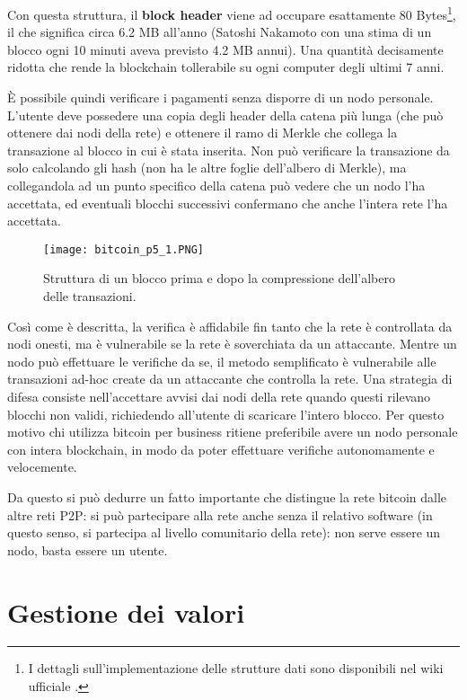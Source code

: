 Con questa struttura, il \textbf{block header} viene ad occupare esattamente 80 Bytes\footnote{I dettagli sull'implementazione delle strutture dati sono disponibili nel wiki ufficiale \cite{bitcoin-protocol}.}, il che significa circa 6.2 MB all'anno (Satoshi Nakamoto con una stima di un blocco ogni 10 minuti aveva previsto 4.2 MB annui). Una quantità decisamente ridotta che rende la blockchain tollerabile su ogni computer degli ultimi 7 anni.

È possibile quindi verificare i pagamenti senza disporre di un nodo personale. L'utente deve possedere una copia degli header della catena più lunga (che può ottenere dai nodi della rete) e ottenere il ramo di Merkle che collega la transazione al blocco in cui è stata inserita. Non può verificare la transazione da solo calcolando gli hash (non ha le altre foglie dell'albero di Merkle), ma collegandola ad un punto specifico della catena può vedere che un nodo l'ha accettata, ed eventuali blocchi successivi confermano che anche l'intera rete l'ha accettata.

\begin{figure}[htbp]
\centering
\texttt{[image: bitcoin\_p5\_1.PNG]}
\caption{Struttura di un blocco prima e dopo la compressione dell'albero delle transazioni.\label{bitcoin_p5_1}}
\end{figure}

Così come è descritta, la verifica è affidabile fin tanto che la rete è controllata da nodi onesti, ma è vulnerabile se la rete è soverchiata da un attaccante. Mentre un nodo può effettuare le verifiche da se, il metodo semplificato è vulnerabile alle transazioni ad-hoc create da un attaccante che controlla la rete. Una strategia di difesa consiste nell'accettare avvisi dai nodi della rete quando questi rilevano blocchi non validi, richiedendo all'utente di scaricare l'intero blocco. Per questo motivo chi utilizza bitcoin per business ritiene preferibile avere un nodo personale con intera blockchain, in modo da poter effettuare verifiche autonomamente e velocemente.

Da questo si può dedurre un fatto importante che distingue la rete bitcoin dalle altre reti P2P: si può partecipare alla rete anche senza il relativo software (in questo senso, si partecipa al livello comunitario della rete): non serve essere un nodo, basta essere un utente.

\section{Gestione dei valori}\label{gestione-dei-valori}

